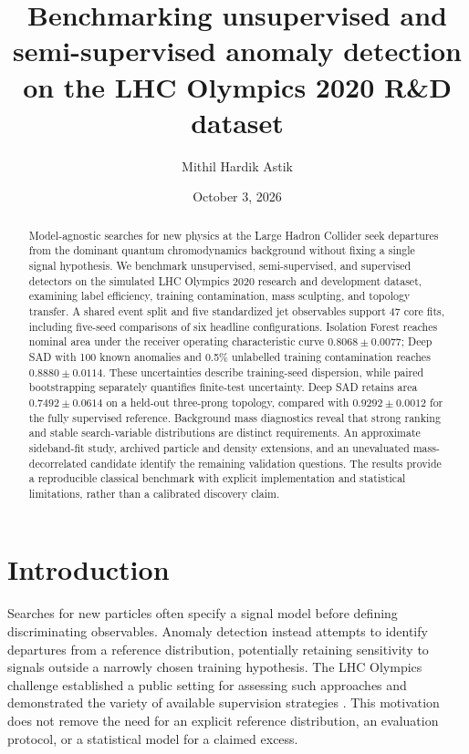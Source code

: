 \documentclass[reprint,aps,pra,amsmath,amssymb,floatfix,raggedbottom]{revtex4-2}
\begin{document}
\title{Benchmarking unsupervised and semi-supervised anomaly detection on the LHC Olympics 2020 R\&D dataset}
\author{Mithil Hardik Astik}
\date{October 3, 2026}
\begin{abstract}
Model-agnostic searches for new physics at the Large Hadron Collider seek departures from the dominant quantum chromodynamics background without fixing a single signal hypothesis. We benchmark unsupervised, semi-supervised, and supervised detectors on the simulated LHC Olympics 2020 research and development dataset, examining label efficiency, training contamination, mass sculpting, and topology transfer. A shared event split and five standardized jet observables support 47 core fits, including five-seed comparisons of six headline configurations. Isolation Forest reaches nominal area under the receiver operating characteristic curve $0.8068\pm0.0077$; Deep SAD with 100 known anomalies and 0.5\% unlabelled training contamination reaches $0.8880\pm0.0114$. These uncertainties describe training-seed dispersion, while paired bootstrapping separately quantifies finite-test uncertainty. Deep SAD retains area $0.7492\pm0.0614$ on a held-out three-prong topology, compared with $0.9292\pm0.0012$ for the fully supervised reference. Background mass diagnostics reveal that strong ranking and stable search-variable distributions are distinct requirements. An approximate sideband-fit study, archived particle and density extensions, and an unevaluated mass-decorrelated candidate identify the remaining validation questions. The results provide a reproducible classical benchmark with explicit implementation and statistical limitations, rather than a calibrated discovery claim.
\end{abstract}
\maketitle

\section{Introduction}
Searches for new particles often specify a signal model before defining discriminating observables. Anomaly detection instead attempts to identify departures from a reference distribution, potentially retaining sensitivity to signals outside a narrowly chosen training hypothesis. The LHC Olympics challenge established a public setting for assessing such approaches and demonstrated the variety of available supervision strategies \cite{lhco}. This motivation does not remove the need for an explicit reference distribution, an evaluation protocol, or a statistical model for a claimed excess.
\end{document}
